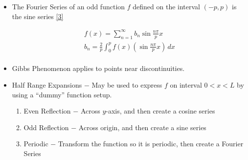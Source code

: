 \documentclass[12pt]{article}
\begin{document}
\begin{itemize}
  \item The Fourier Series of an odd function $f$ defined on the interval $(-p,p)$ is the sine series \eqref{3}

    \begin{equation}
      \begin{split}
        f(x)=\sum_{n=1}^{\infty} b_n\sin\frac{n\pi}{p}x\\
      b_n=\frac{2}{p}\int_0^pf(x)\left(\sin\frac{n\pi}{p}x\right)\,dx\\
      \end{split}
      \label{3}
    \end{equation}

  \item Gibbs Phenomenon applies to points near discontinuities.

  \item Half Range Expansions $-$ May be used to express $f$ on interval $0< x< L$ by using a ``dummy'' function setup.

    \begin{enumerate}

      \item Even Reflection $-$ Across $y$-axis, and then create a cosine series

      \item Odd Reflection $-$ Across origin, and then create a sine series

      \item Periodic $-$ Transform the function so it is periodic, then create a Fourier Series

    \end{enumerate}

\end{itemize}
\end{document}
